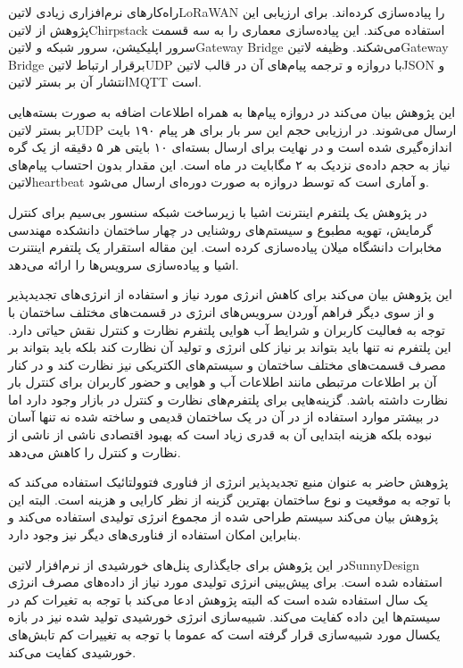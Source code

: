 راه‌کارهای نرم‌افزاری زیادی ‌لاتین{LoRaWAN} را پیاده‌سازی کرده‌اند.
برای ارزیابی این پژوهش از ‌لاتین{Chirpstack} استفاده می‌کند.
این پیاده‌سازی معماری را به سه قسمت سرور اپلیکیشن، سرور شبکه و ‌لاتین{Gateway Bridge}
می‌شکند.
وظیفه ‌لاتین{Gateway Bridge} برقرار ارتباط ‌لاتین{UDP} با دروازه و ترجمه پیام‌های آن در قالب
‌لاتین{JSON} و انتشار آن بر بستر ‌لاتین{MQTT} است.

این پژوهش بیان می‌کند در دروازه پیام‌ها به همراه اطلاعات اضافه به صورت بسته‌هایی بر بستر ‌لاتین{UDP} ارسال می‌شوند.
در ارزیابی حجم این سر بار برای هر پیام ۱۹۰ بایت اندازه‌گیری شده است و در نهایت برای ارسال بسته‌ای ۱۰ بایتی هر ۵ دقیقه از یک گره نیاز به
حجم داده‌ی نزدیک به ۲ مگابایت در ماه است. این مقدار بدون احتساب پیام‌های ‌لاتین{heartbeat} و آماری است که توسط دروازه
به صورت دوره‌ای ارسال می‌شود.


در پژوهش  یک پلتفرم اینترنت اشیا با زیرساخت شبکه سنسور بی‌سیم برای کنترل گرمایش، تهویه مطبوع و سیستم‌های روشنایی در چهار ساختمان دانشکده
مهندسی مخابرات دانشگاه میلان پیاده‌سازی کرده است. این مقاله استقرار یک پلتفرم اینتنرت اشیا و پیاده‌سازی سرویس‌ها را ارائه می‌دهد.

این پژوهش بیان می‌کند برای کاهش انرژی مورد نیاز و استفاده از انرژی‌های تجدیدپذیر و از سوی دیگر فراهم آوردن سرویس‌های انرژی در قسمت‌های مختلف ساختمان با توجه به فعالیت
کاربران و شرایط آب هوایی پلتفرم نظارت و کنترل نقش حیاتی دارد. این پلتفرم نه تنها باید بتواند بر نیاز کلی انرژی و تولید آن نظارت کند بلکه باید بتواند بر مصرف قسمت‌های مختلف ساختمان
و سیستم‌های الکتریکی نیز نظارت کند و در کنار آن بر اطلاعات مرتبطی مانند اطلاعات آب و هوایی و حضور کاربران برای کنترل بار نظارت داشته باشد.
گزینه‌هایی برای پلتفرم‌های نظارت و کنترل در بازار وجود دارد اما در بیشتر موارد استفاده از در آن در یک ساختمان قدیمی و ساخته شده نه تنها آسان نبوده بلکه هزینه ابتدایی آن به قدری زیاد است
که بهبود اقتصادی ناشی از ناشی از نظارت و کنترل را کاهش می‌دهد.

پژوهش حاضر به عنوان منبع تجدید‌پذیر انرژی از فناوری فتوولتائیک استفاده می‌کند که با توجه به موقعیت و نوع ساختمان بهترین گزینه از نظر کارایی و هزینه است.
البته این پژوهش بیان می‌کند سیستم طراحی شده از مجموع انرژی تولیدی استفاده می‌کند و بنابراین امکان استفاده از فناوری‌های دیگر نیز وجود دارد.

در این پژوهش برای جایگذاری پنل‌های خورشیدی از نرم‌افزار ‌لاتین{SunnyDesign} استفاده شده است. برای پیش‌بینی انرژی تولیدی مورد نیاز از داده‌های مصرف
انرژی یک سال استفاده شده است که البته پژوهش ادعا می‌کند با توجه به تغیرات کم در سیستم‌ها این داده کفایت می‌کند. شبیه‌سازی انرژی خورشیدی تولید شده نیز
در بازه یکسال مورد شبیه‌سازی قرار گرفته است که عموما با توجه به تغییرات کم تابش‌های خورشیدی کفایت می‌کند.

